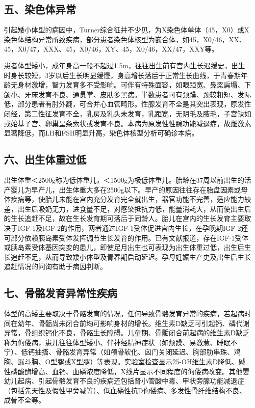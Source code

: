 \subsection{五、染色体异常}

引起矮小体型的病因中，Turner综合征并不少见，为X染色体单体（45，X0）或X染色体结构异常所致疾病，部分患者染色体核型为嵌合体，如45，X0/46，XX、45，X0/47，XXX、45，X0/46，XY、45，X0/46，XX/47，XXY等。

患者体型矮小，成年身高一般不超过1.5m，往往出生前有宫内生长迟缓史，出生时身长较短，3岁以后生长明显缓慢，身高增长落后于正常生长曲线，于青春期年龄无身材激增，智力发育多不受影响。可伴有特殊面容，如眼距宽、鼻梁扁塌、下颌小、牙床发育不良、通贯掌、皮肤多黑痣。半数患者可有颈蹼、颈较粗短、发际低，部分患者有肘外翻，可合并心血管畸形。性腺发育不全是其突出表现，原发性闭经，第二性征发育不全，乳房及乳头未发育，乳距宽，无阴毛及腋毛，子宫缺如或始基子宫、卵巢呈条索状或发育不良。本病为原发性性腺功能减退症，故雌激素显著降低，而LH和FSH明显升高，染色体核型分析可确诊本病。

\subsection{六、出生体重过低}

出生体重＜2500g称为低体重儿，＜1500g为极低体重儿。胎龄在37周以前出生的活产婴儿为早产儿，出生体重大多在2500g以下。早产的原因往往存在胎盘因素或母体疾病等，使胎儿未能在宫内充分发育完全就出生，器官功能不完善，适应能力较差，出生后吸奶无力，进食量不足，对感染抵抗力低，能量消耗大，从而使出生后的生长追赶不足，故在生长发育期可落后于同龄人。胎儿在宫内的生长发育主要取决于IGF-1及IGF-2的作用，两者通过IGF-1受体促进宫内生长，在孕晚期IGF-2还可部分依赖胰岛素受体发挥调节生长发育的作用。已有文献报道，存在IGF-1受体或胰岛素受体基因突变的患儿，即使足月出生也可表现为出生体重过低，出生后生长追赶不足，从而导致矮小体型及青春期启动延迟。孕母妊娠生产史及出生后生长追赶情况的问询有助于病因判断。

\subsection{七、骨骼发育异常性疾病}

体型的高矮主要取决于骨骼发育的情况，任何导致骨骼发育异常的疾病，若起病时间在幼年、骨骺尚未闭合前均可影响身材的增长。维生素D缺乏可引起钙、磷代谢异常，骨组织钙化不良，骨骼生长障碍。儿童期、骨骺闭合前起病的维生素D缺乏称为佝偻病，患儿往往体型矮小、伴神经精神症状（如烦躁、易激惹、睡眠不宁）、低钙抽搐、骨骼发育异常（如颅骨软化、囟门关闭延迟、胸部肋串珠、鸡胸、漏斗胸、O型腿或X型腿）等表现。实验室检查显示25-OH维生素D降低、碱性磷酸酶增高、血钙、血磷浓度降低，X线片显示不同程度的佝偻病改变。其他婴幼儿起病、引起骨骼发育不良的疾病还包括肾小管酸中毒、甲状旁腺功能减退症（包括先天性及假性甲旁减等）、低血磷性抗D佝偻病、多发性骨纤维结构不良、成骨不全等。

